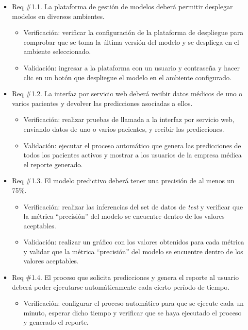 \documentclass[
11pt, %
]{charter}
\begin{document}
\begin{itemize}
	\item Req \#1.1. La plataforma de gestión de modelos deberá permitir desplegar modelos en diversos ambientes.
	\begin{itemize}
		\item Verificación: verificar la configuración de la plataforma de despliegue para comprobar que se toma la última versión del modelo y se despliega en el ambiente seleccionado.
		\item Validación: ingresar a la plataforma con un usuario y contraseña y hacer clic en un botón que despliegue el modelo en el ambiente configurado. 
	\end{itemize}
	\item Req \#1.2. La interfaz por servicio web deberá recibir datos médicos de uno o varios pacientes y devolver las predicciones asociadas a ellos.	
	\begin{itemize}
		\item Verificación: realizar pruebas de llamada a la interfaz por servicio web, enviando datos de uno o varios pacientes, y recibir las predicciones.
		\item Validación: ejecutar el proceso automático que genera las predicciones de todos los pacientes activos y mostrar a los usuarios de la empresa médica el reporte generado.
	\end{itemize}			
	\item Req \#1.3. El modelo predictivo deberá tener una precisión de al menos un 75\%.
	\begin{itemize}
		\item Verificación: realizar las inferencias del set de datos de \textit{test} y verificar que la métrica ``precisión'' del modelo se encuentre dentro de los valores aceptables.
		\item Validación: realizar un gráfico con los valores obtenidos para cada métrica y validar que la métrica ``precisión'' del modelo se encuentre dentro de los valores aceptables.
	\end{itemize}
	\item Req \#1.4. El proceso que solicita predicciones y genera el reporte al usuario deberá poder ejecutarse automáticamente cada cierto período de tiempo.		
	\begin{itemize}
		\item Verificación: configurar el proceso automático para que se ejecute cada un minuto, esperar dicho tiempo y verificar que se haya ejecutado el proceso y generado el reporte.

\end{itemize}
\end{itemize}
\end{document}
